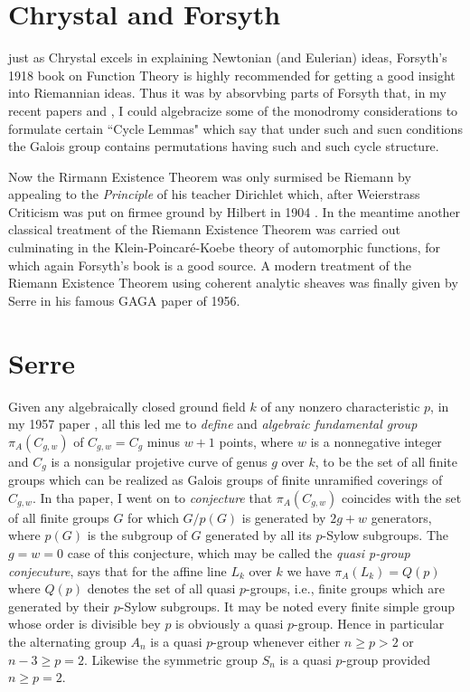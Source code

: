 \section{Chrystal and Forsyth}
just as Chrystal excels in explaining Newtonian (and Eulerian) ideas, Forsyth's 1918 book on Function Theory \cite{art1-key31} is highly recommended for getting a good insight into Riemannian ideas. Thus it was by absorvbing parts of Forsyth that, in my recent papers \cite{art1-key8} and \cite{art-key10}, I could algebracize some of the monodromy considerations to formulate certain ``Cycle Lemmas" which say that under such and sucn conditions the Galois group contains permutations having such and such cycle structure.

Now the Rirmann Existence Theorem was only surmised be Riemann \cite{art1-key52} by appealing to the \textit{Principle} of his teacher Dirichlet which, after Weierstrass Criticism was put on firmee ground by Hilbert in 1904 \cite{art1-key35}. In the meantime another classical treatment of the Riemann Existence Theorem was carried out culminating in the Klein-Poincar\'e-Koebe theory of automorphic functions, for which again Forsyth's book is a good source. A modern treatment of the Riemann Existence Theorem using coherent analytic sheaves was finally given by Serre in his famous GAGA paper \cite{art1-key55} of 1956.

\section{Serre}

Given any algebraically closed ground field $k$ of any nonzero characteristic $p$, in my 1957 paper \cite{art1-key3}, all this led me to \textit{define} and \textit{algebraic fundamental group} $\pi_{A}(C_{g,w})$ of $C_{g,w} = C_{g}$ minus $w+1$ points, where $w$ is a nonnegative integer and $C_{g}$ is a nonsigular projetive curve of genus $g$ over $k$, to be the set of all finite groups which can be realized as Galois groups of finite unramified coverings of $C_{g,w}$. In tha paper, I went on to \textit{conjecture} that $\pi_{A}(C_{g,w})$ coincides with the set of all finite groups $G$ for which $G/p(G)$ is generated by $2g+w$ generators, where $p(G)$ is the subgroup of $G$ generated by all its $p$-Sylow subgroups. The $g=w=0$ case of this conjecture, which may be called the \textit{quasi p-group conjecuture}, says that for the affine line $L_{k}$ over $k$ we have $\pi_{A}(L_{k})=Q(p)$ where $Q(p)$ denotes the set of all quasi $p$-groups, i.e., finite groups which are generated by their $p$-Sylow subgroups. It may be noted every finite simple group whose order is divisible bey $p$ is obviously a quasi $p$-group. Hence in particular the alternating group $A_{n}$ is a quasi $p$-group whenever either $n\geq p > 2$ or $n-3\geq p=2$. Likewise the symmetric group $S_{n}$ is a quasi $p$-group provided $n\geq p=2$.   

